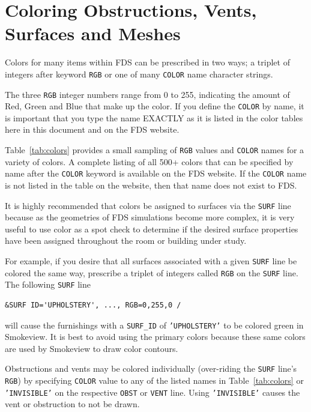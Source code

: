 \documentclass[11pt]{book}
\newcommand{\ct}{\tt\small}
\begin{document}
\clearpage

\section{Coloring Obstructions, Vents, Surfaces and Meshes}
\label{info:colors}

Colors for many items within FDS can be prescribed in two ways; a triplet of
integers after keyword {\ct RGB} or one of many {\ct COLOR} name character strings.

The three {\ct RGB} integer numbers range from 0 to 255, indicating the amount of Red, Green and Blue
that make up the color. If you define the {\ct COLOR} by name, it is important that you type the name EXACTLY as it
is listed in the color tables here in this document and on the FDS website.

Table~\ref{tab:colors} provides a small sampling of {\ct RGB} values and {\ct COLOR} names
for a variety of colors. A complete listing of all 500+ colors that can be
specified by name after the {\ct COLOR} keyword is available on the FDS website.
If the {\ct COLOR} name is not listed in the table on the website, then that name does not exist to FDS.

It is highly recommended that colors be assigned to surfaces via the {\ct SURF} line because as
the geometries of FDS simulations become more complex, it is very useful
to use color as a spot check to determine if the desired
surface properties have been assigned throughout the room or building under study.

For example, if you desire that all surfaces associated with a
given {\ct SURF} line be colored the same way, prescribe a triplet of
integers called {\ct RGB} on the {\ct SURF} line. The following {\ct SURF} line

\footnotesize
\begin{verbatim}
&SURF ID='UPHOLSTERY', ..., RGB=0,255,0 /
\end{verbatim}
\normalsize

\noindent
will cause the furnishings with a {\ct SURF\_ID} of {\ct 'UPHOLSTERY'} to be colored green in Smokeview.
It is best to avoid using the primary colors because these same colors are
used by Smokeview to draw color contours.

Obstructions and vents may be colored individually (over-riding the
{\ct SURF} line's {\ct RGB}) by specifying {\ct COLOR} value to any of
the listed names in Table~\ref{tab:colors} or {\ct 'INVISIBLE'} on
the respective {\ct OBST} or {\ct VENT} line. Using {\ct 'INVISIBLE'}
causes the vent or obstruction to not be drawn.
\end{document}
